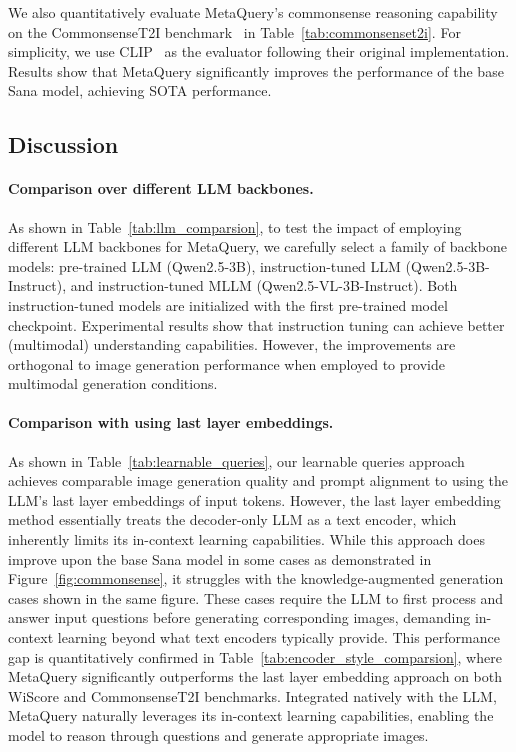 \documentclass[]{fairmeta}
\newcommand\our{{\fontfamily{lmtt}\selectfont MetaQuery}\xspace}
\begin{document}
We also quantitatively evaluate \our's commonsense reasoning capability on the CommonsenseT2I benchmark~\citep{commonsenset2i} in Table~\ref{tab:commonsenset2i}. For simplicity, we use CLIP~\citep{clip} as the evaluator following their original implementation. Results show that \our significantly improves the performance of the base Sana model, achieving SOTA performance.

\subsection{Discussion}
\label{sec:discussion}

\paragraph{Comparison over different LLM backbones.}
As shown in Table~\ref{tab:llm_comparsion}, to test the impact of employing different LLM backbones for \our, we carefully select a family of backbone models: pre-trained LLM (Qwen2.5-3B), instruction-tuned LLM (Qwen2.5-3B-Instruct), and instruction-tuned MLLM (Qwen2.5-VL-3B-Instruct). Both instruction-tuned models are initialized with the first pre-trained model checkpoint. Experimental results show that instruction tuning can achieve better (multimodal) understanding capabilities. However, the improvements are orthogonal to image generation performance when employed to provide multimodal generation conditions.

\paragraph{Comparison with using last layer embeddings.}
As shown in Table~\ref{tab:learnable_queries}, our learnable queries approach achieves comparable image generation quality and prompt alignment to using the LLM's last layer embeddings of input tokens. However, the last layer embedding method essentially treats the decoder-only LLM as a text encoder, which inherently limits its in-context learning capabilities. While this approach does improve upon the base Sana model in some cases as demonstrated in Figure~\ref{fig:commonsense}, it struggles with the knowledge-augmented generation cases shown in the same figure. These cases require the LLM to first process and answer input questions before generating corresponding images, demanding in-context learning beyond what text encoders typically provide. This performance gap is quantitatively confirmed in Table~\ref{tab:encoder_style_comparsion}, where \our significantly outperforms the last layer embedding approach on both WiScore and CommonsenseT2I benchmarks. Integrated natively with the LLM, \our naturally leverages its in-context learning capabilities, enabling the model to reason through questions and generate appropriate images.
\end{document}
